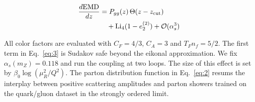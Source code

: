 \begin{align}
  \frac{d \mathrm{EMD}}{d z} &= P_{gg}(z) \, \Theta(z - z_{\rm cut}) \nonumber \\
  &\quad + \mathrm{Li}_{4}(1 - e_2^{(2)}) + \mathcal{O}(\alpha_s^3) \label{eq:5}
\end{align}

All color factors are evaluated with $C_F = 4/3$, $C_A = 3$ and $T_F n_f
= 5/2$. The first term in Eq.~\eqref{eq:3} is Sudakov safe beyond the
eikonal approximation. We fix $\alpha_s(m_Z) = 0.118$ and run the
coupling at two loops. The size of this effect is set by $\beta_0
\log(\mu_R^2/Q^2)$. The parton distribution function in Eq.~\eqref{eq:2}
resums the interplay between positive scattering amplitudes and parton
showers trained on the quark/gluon dataset in the strongly ordered
limit.

